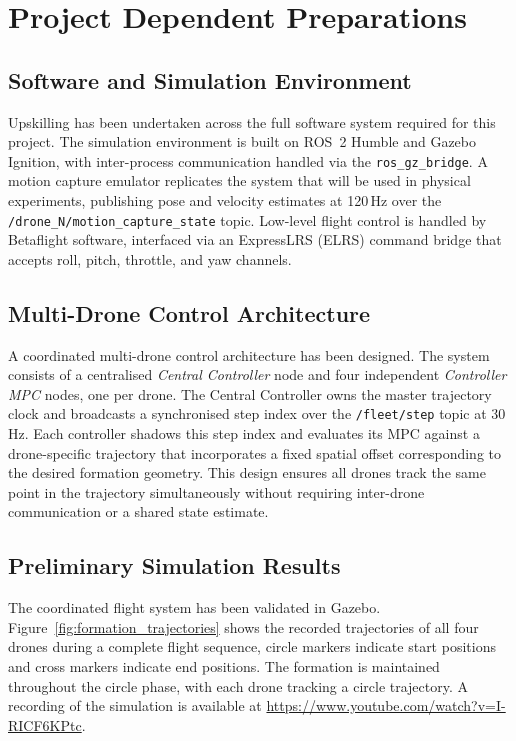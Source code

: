 \section{Project Dependent Preparations}
\label{sec:pdp}
\subsection{Software and Simulation Environment}

Upskilling has been undertaken across the full software system required for this project. The simulation environment is built on ROS~2 Humble and Gazebo Ignition, with inter-process communication handled via the \texttt{ros\_gz\_bridge}. A motion capture emulator replicates the system that will be used in physical experiments, publishing pose and velocity estimates at 120\,Hz over the \texttt{/drone\_N/motion\_capture\_state} topic. Low-level flight control is handled by Betaflight software, interfaced via an ExpressLRS (ELRS) command bridge that accepts roll, pitch, throttle, and yaw channels.

\subsection{Multi-Drone Control Architecture}

A coordinated multi-drone control architecture has been designed. The system consists of a centralised \textit{Central Controller} node and four independent \textit{Controller MPC} nodes, one per drone. The Central Controller owns the master trajectory clock and broadcasts a synchronised step index over the \texttt{/fleet/step} topic at 30\,Hz. Each controller shadows this step index and evaluates its MPC against a drone-specific trajectory that incorporates a fixed spatial offset corresponding to the desired formation geometry. This design ensures all drones track the same point in the trajectory simultaneously without requiring inter-drone communication or a shared state estimate.

\subsection{Preliminary Simulation Results}

The coordinated flight system has been validated in Gazebo. Figure~\ref{fig:formation_trajectories} shows the recorded trajectories of all four drones during a complete flight sequence, circle markers indicate start positions and cross markers indicate end positions. The formation is maintained throughout the circle phase, with each drone tracking a circle trajectory. A recording of the simulation is available at \url{https://www.youtube.com/watch?v=I-RICF6KPtc}.

